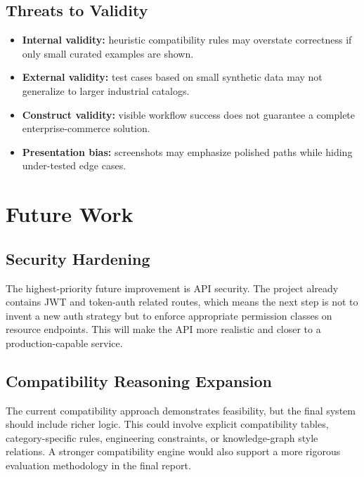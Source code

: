 \documentclass[12pt,letterpaper,oneside,openany]{book}
\begin{document}
\section{Threats to Validity}

\begin{itemize}[leftmargin=0.4in]
    \item \textbf{Internal validity:} heuristic compatibility rules may overstate correctness if only small curated examples are shown.
    \item \textbf{External validity:} test cases based on small synthetic data may not generalize to larger industrial catalogs.
    \item \textbf{Construct validity:} visible workflow success does not guarantee a complete enterprise-commerce solution.
    \item \textbf{Presentation bias:} screenshots may emphasize polished paths while hiding under-tested edge cases.
\end{itemize}

\chapter{Future Work}

\section{Security Hardening}

\begin{justifying}
The highest-priority future improvement is API security. The project already
contains JWT and token-auth related routes, which means the next step is not to
invent a new auth strategy but to enforce appropriate permission classes on
resource endpoints. This will make the API more realistic and closer to a
production-capable service.
\end{justifying}

\section{Compatibility Reasoning Expansion}

\begin{justifying}
The current compatibility approach demonstrates feasibility, but the final
system should include richer logic. This could involve explicit compatibility
tables, category-specific rules, engineering constraints, or knowledge-graph
style relations. A stronger compatibility engine would also support a more
rigorous evaluation methodology in the final report.
\end{justifying}
\end{document}
